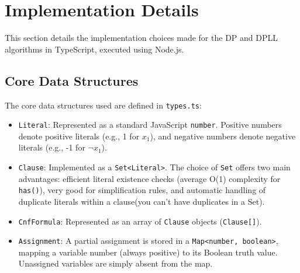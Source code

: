 \documentclass[12pt, a4paper]{article}
\begin{document}
\section{Implementation Details}
\label{sec:implementation}

This section details the implementation choices made for the DP and DPLL algorithms in TypeScript, executed using Node.js.

\subsection{Core Data Structures}
The core data structures used are defined in \texttt{types.ts}:
\begin{itemize}
    \item \texttt{Literal}: Represented as a standard JavaScript \texttt{number}. Positive numbers denote positive literals (e.g., 1 for $x_1$), and negative numbers denote negative literals (e.g., -1 for $\lnot x_1$).
    \item \texttt{Clause}: Implemented as a \texttt{Set<Literal>}. The choice of \texttt{Set} offers two main advantages: efficient literal existence checks (average O(1) complexity for \texttt{has()}), very good for simplification rules, and automatic handling of duplicate literals within a clause(you can't have duplicates in a Set).
    \item \texttt{CnfFormula}: Represented as an array of \texttt{Clause} objects (\texttt{Clause[]}).
    \item \texttt{Assignment}: A partial assignment is stored in a \texttt{Map<number, boolean>}, mapping a variable number (always positive) to its Boolean truth value. Unassigned variables are simply absent from the map.
\end{itemize}
\end{document}
